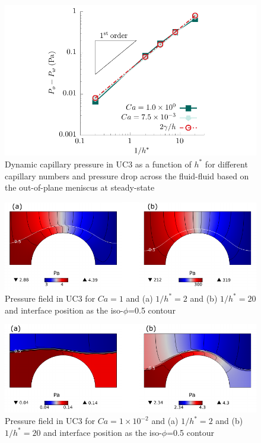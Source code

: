\documentclass[]{article}
\begin{document}
\begin{figure}
\hypertarget{fig:Pc}{%
\centering
\includegraphics{figures/pdf/Pc.pdf}
\caption{Dynamic capillary pressure in UC3 as a function of \(h^*\) for
different capillary numbers and pressure drop across the fluid-fluid
based on the out-of-plane meniscus at steady-state}\label{fig:Pc}
}
\end{figure}

\begin{figure}
\hypertarget{fig:pFieldCa1}{%
\centering
\includegraphics{figures/pdf/pFieldCa1.pdf}
\caption{Pressure field in UC3 for \(Ca=1\) and (a) \(1/h^*=2\) and (b)
\(1/h^*=20\) and interface position as the iso-\(\phi\)=0.5
contour}\label{fig:pFieldCa1}
}
\end{figure}

\begin{figure}
\hypertarget{fig:pFieldCa001}{%
\centering
\includegraphics{figures/pdf/pFieldCa001.pdf}
\caption{Pressure field in UC3 for \(Ca=1 \times 10^{-2}\) and (a)
\(1/h^*=2\) and (b) \(1/h^*=20\) and interface position as the
iso-\(\phi\)=0.5 contour}\label{fig:pFieldCa001}
}
\end{figure}
\end{document}
